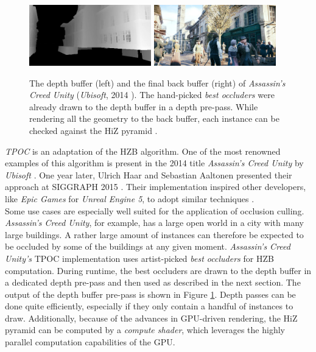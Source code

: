 \begin{figure}[h]
    \centering
    \includegraphics[width=200px]{images/graphics/depth-buffer-ac-unity.jpg}
    \includegraphics[width=200px]{images/graphics/final-frame-ac-unity.jpg}
    \caption{The depth buffer (left) and the final back buffer (right) of \emph{Assassin's Creed Unity} (\emph{Ubisoft}, 2014 \cite{Ubisoft2014}). 
    The hand-picked \emph{best occluders} were already drawn to the depth buffer in a depth pre-pass.
    While rendering all the geometry to the back buffer, each instance can be checked against the \ac{HiZ} pyramid \cite{Kruskonja2022}.}
    \label{fig:depth-buffer-ac-unity}
\end{figure}

\noindent
\emph{\ac{TPOC}} is an adaptation of the \ac{HZB} algorithm. One of the most renowned examples of this algorithm is 
present in the 2014 title \emph{Assassin's Creed Unity} by \emph{Ubisoft} \cite{Ubisoft2014}. One year later, Ulrich 
Haar and Sebastian Aaltonen presented their approach at SIGGRAPH 2015 \cite{Aaltonen2015}. Their implementation 
inspired other developers, like \emph{Epic Games} for \emph{Unreal Engine 5}, to adopt similar techniques \cite{Karis2021}. \\

\noindent
Some use cases are especially well suited for the application of occlusion culling. \emph{Assassin's Creed Unity}, for 
example, has a large open world in a city with many large buildings. A rather large amount of instances can therefore be 
expected to be occluded by some of the buildings at any given moment. \emph{Assassin's Creed Unity's} \ac{TPOC} 
implementation uses artist-picked \emph{best occluders} for \ac{HZB} computation. During runtime, the best occluders are 
drawn to the depth buffer in a dedicated depth pre-pass and then used as described in the next section. 
The output of the depth buffer pre-pass is shown in Figure \ref{fig:depth-buffer-ac-unity}. Depth passes can be done 
quite efficiently, especially if they only contain a handful of instances to draw. Additionally, because of the advances 
in \ac{GPU}-driven rendering, the \ac{HiZ} pyramid can be computed by a \emph{compute shader}, which leverages the 
highly parallel computation capabilities of the \ac{GPU}. \\

